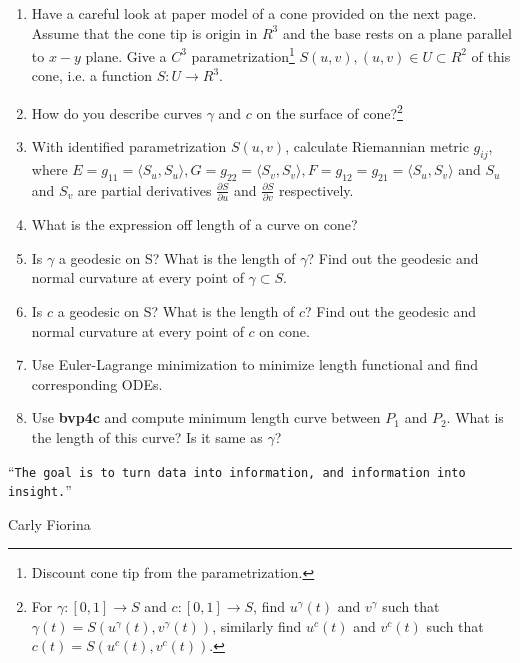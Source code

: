 \documentclass{exmppr}
\begin{document}
\begin{enumerate}
\item Have a careful look at paper model of a cone provided on the next page. Assume that the cone tip is origin in $R^3$ and the base rests on a plane parallel to $x-y$ plane. Give a $C^3$ parametrization\footnote{Discount cone tip from the parametrization.} $S(u,v), (u,v) \in U \subset R^2$ of this cone, i.e. a function $S: U \rightarrow R^3$.

\item How do you describe curves $\gamma$ and $c$ on the surface of cone?\footnote{For $\gamma:[0,1] \rightarrow S$ and $c:[0,1] \rightarrow S$, find $u^{\gamma}(t)$ and $v^{\gamma}$ such that $\gamma(t) = S(u^{\gamma}(t), v^{\gamma}(t))$, similarly find $u^c(t)$ and $v^c(t)$ such that $c(t) = S(u^c(t), v^c(t))$.}

\item With identified parametrization $S(u,v)$, calculate Riemannian metric $g_{ij}$, where $E = g_{11} = \langle S_u, S_u \rangle, G = g_{22} = \langle S_v, S_v \rangle, F = g_{12} = g_{21} = \langle S_u, S_v \rangle$ and $S_u$ and $S_v$ are partial derivatives $\frac{\partial S}{\partial u}$ and $\frac{\partial S}{\partial v}$ respectively.

\item What is the expression off length of a curve on cone?

\item Is $\gamma$ a geodesic on S? What is the length of $\gamma$? Find out the geodesic and normal curvature at every point of $\gamma \subset S$.

\item Is $c$ a geodesic on S? What is the length of $c$? Find out the geodesic and normal curvature at every point of $c$ on cone.

\item Use Euler-Lagrange minimization to minimize length functional and find corresponding ODEs.

\item Use \textbf{bvp4c} and compute minimum length curve between $P_1$ and $P_2$. What is the length of this curve? Is it same as $\gamma$?

\end{enumerate}

\hrulefill

\epigraph{``\texttt{The goal is to turn data into information, and information into insight.}''}{Carly Fiorina}
\end{document}
